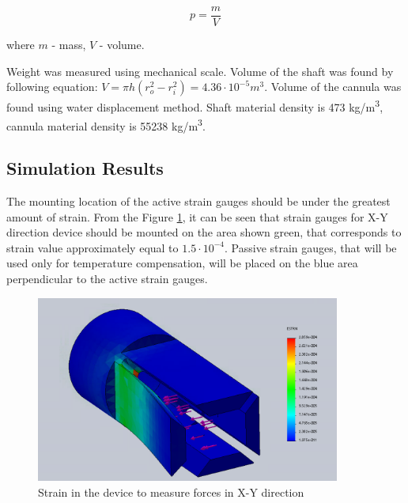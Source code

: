 \begin{equation}
p=\frac{m}{V}
\end{equation}

where $m$ - mass, $V$ - volume.

Weight was measured using mechanical scale. Volume of the shaft was found by following equation: $V =  \pi h(r_o^2-r_i^2) = 4.36 \cdot 10^{-5} m^3$. Volume of the cannula was found using water displacement method. Shaft material density is 473 kg/m\textsuperscript{3}, cannula material density is 55238 kg/m\textsuperscript{3}.

\subsection{Simulation Results}
\label{sec:FEAres}
The mounting location of the active strain gauges should be under the greatest amount of strain. From the Figure \ref{fig:XYdev}, it can be seen that strain gauges for X-Y direction device should be mounted on the area shown green, that corresponds to strain value approximately equal to $1.5 \cdot 10^{-4}$. Passive strain gauges, that will be used only for temperature compensation, will be placed on the blue area perpendicular to the active strain gauges.

\begin{figure}[h]
	\begin{center}
		\includegraphics[width=100mm]{fig/methods/old_sleeve.png}
	\end{center}
	\vspace{-4mm}
	\caption[X-Y device]
	{Strain in the device to measure forces in X-Y direction}
	\label{fig:XYdev}
	\vspace{-2mm}
\end{figure}


